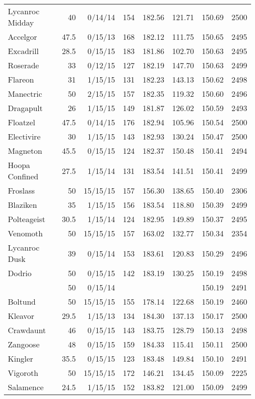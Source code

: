 \begin{longtable}{lrrrrrrr}
Lycanroc Midday & 40 & 0/14/14 & 154 & 182.56 & 121.71 & 150.69 & 2500\\
Accelgor & 47.5 & 0/15/13 & 168 & 182.12 & 111.75 & 150.65 & 2495\\
Excadrill & 28.5 & 0/15/15 & 183 & 181.86 & 102.70 & 150.63 & 2495\\
Roserade & 33 & 0/12/15 & 127 & 182.19 & 147.70 & 150.63 & 2499\\
Flareon & 31 & 1/15/15 & 131 & 182.23 & 143.13 & 150.62 & 2498\\
Manectric & 50 & 2/15/15 & 157 & 182.35 & 119.32 & 150.60 & 2496\\
Dragapult & 26 & 1/15/15 & 149 & 181.87 & 126.02 & 150.59 & 2493\\
Floatzel & 47.5 & 0/14/15 & 176 & 182.94 & 105.96 & 150.54 & 2500\\
Electivire & 30 & 1/15/15 & 143 & 182.93 & 130.24 & 150.47 & 2500\\
Magneton & 45.5 & 0/15/15 & 124 & 182.37 & 150.48 & 150.41 & 2494\\
Hoopa Confined & 27.5 & 1/15/14 & 131 & 183.54 & 141.51 & 150.41 & 2499\\
Froslass & 50 & 15/15/15 & 157 & 156.30 & 138.65 & 150.40 & 2306\\
Blaziken & 35 & 1/15/15 & 156 & 183.54 & 118.80 & 150.39 & 2499\\
Polteageist & 30.5 & 1/15/14 & 124 & 182.95 & 149.89 & 150.37 & 2495\\
Venomoth & 50 & 15/15/15 & 157 & 163.02 & 132.77 & 150.34 & 2354\\
Lycanroc Dusk & 39 & 0/15/14 & 153 & 183.61 & 120.83 & 150.29 & 2496\\
Dodrio & 50 & 0/15/15 & 142 & 183.19 & 130.25 & 150.19 & 2498\\
 & 50 & 0/15/14 & & & & 150.19 & 2491\\
Boltund & 50 & 15/15/15 & 155 & 178.14 & 122.68 & 150.19 & 2460\\
Kleavor & 29.5 & 1/15/13 & 134 & 184.30 & 137.13 & 150.17 & 2500\\
Crawdaunt & 46 & 0/15/15 & 143 & 183.75 & 128.79 & 150.13 & 2498\\
Zangoose & 48 & 0/15/15 & 159 & 184.33 & 115.41 & 150.11 & 2500\\
Kingler & 35.5 & 0/15/15 & 123 & 183.48 & 149.84 & 150.10 & 2491\\
Vigoroth & 50 & 15/15/15 & 172 & 146.21 & 134.45 & 150.09 & 2225\\
Salamence & 24.5 & 1/15/15 & 152 & 183.82 & 121.00 & 150.09 & 2499\\

\end{longtable}
